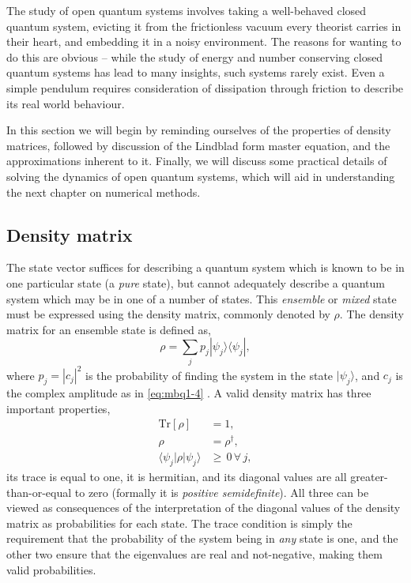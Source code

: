 The study of open quantum systems involves taking a well-behaved closed quantum system, evicting it from the frictionless vacuum every theorist carries in their heart, and embedding it in a noisy environment. The reasons for wanting to do this are obvious -- while the study of energy and number conserving closed quantum systems has lead to many insights, such systems rarely exist. Even a simple pendulum requires consideration of dissipation through friction to describe its real world behaviour.  

In this section we will begin by reminding ourselves of the properties of density matrices, followed by discussion of the Lindblad form master equation, and the approximations inherent to it. Finally, we will discuss some practical details of solving the dynamics of open quantum systems, which will aid in understanding the next chapter on numerical methods.

\subsection{Density matrix}
The state vector suffices for describing a quantum system which is known to be in one particular state (a \emph{pure} state), but cannot adequately describe a quantum system which may be in one of a number of states. This \emph{ensemble} or \emph{mixed} state must be expressed using the density matrix, commonly denoted by \(\rho\). The density matrix for an ensemble state is defined as,
\begin{equation}
	\rho = \sum_{j} p_{j} |\psi_{j} \rangle \langle \psi_{j}|,
	\label{eq:oqs2-1}
\end{equation}
where \(p_{j} = |c_{j}|^{2}\) is the probability of finding the system in the state \(|\psi_{j}\rangle\), and \(c_{j}\) is the complex amplitude as in \cref{eq:mbq1-4} \cite{NielsenChuang_DM}. A valid density matrix has three important properties,
\begin{align}
	\mathrm{Tr}[\rho] &= 1, \label{eq:oqs2-2} \\
	\rho &= \rho^{\dagger}, \label{eq:oqs2-3} \\
	\langle \psi_{j}| \rho | \psi_{j} \rangle &\geq \, 0 \, \forall \, j, \label{eq:oqs2-4}
\end{align}
its trace is equal to one, it is hermitian, and its diagonal values are all greater-than-or-equal to zero (formally it is \emph{positive semidefinite}). All three can be viewed as consequences of the interpretation of the diagonal values of the density matrix as probabilities for each state. The trace condition is simply the requirement that the probability of the system being in \emph{any} state is one, and the other two ensure that the eigenvalues are real and not-negative, making them valid probabilities.


